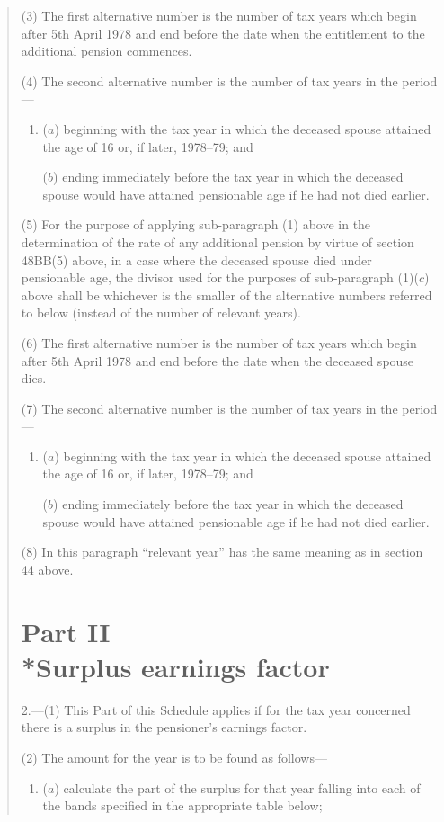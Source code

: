 \documentclass[12pt,a4paper]{article}
\begin{document}
\begin{quotation}
(3) The first alternative number is the number of tax years which begin after 5th April 1978 and end before the date when the entitlement to the additional pension commences.

(4) The second alternative number is the number of tax years in the period—
\begin{enumerate}\item[]
($a$) beginning with the tax year in which the deceased spouse attained the age of 16 or, if later, 1978--79; and

($b$) ending immediately before the tax year in which the deceased spouse would have attained pensionable age if he had not died earlier.
\end{enumerate}

(5) For the purpose of applying sub-paragraph (1)  above in the determination of the rate of any additional pension by virtue of section 48BB(5)  above, in a case where the deceased spouse died under pensionable age, the divisor used for the purposes of sub-paragraph (1)($c$)  above shall be whichever is the smaller of the alternative numbers referred to below (instead of the number of relevant years).

(6) The first alternative number is the number of tax years which begin after 5th April 1978 and end before the date when the deceased spouse dies.

(7) The second alternative number is the number of tax years in the period—
\begin{enumerate}\item[]
($a$) beginning with the tax year in which the deceased spouse attained the age of 16 or, if later, 1978--79; and

($b$) ending immediately before the tax year in which the deceased spouse would have attained pensionable age if he had not died earlier.
\end{enumerate}

(8) In this paragraph “relevant year” has the same meaning as in section 44 above.

\section*{Part II\\*Surplus earnings factor}

2.---(1) This Part of this Schedule applies if for the tax year concerned there is a surplus in the pensioner’s earnings factor.

(2) The amount for the year is to be found as follows—
\begin{enumerate}\item[]
($a$) calculate the part of the surplus for that year falling into each of the bands specified in the appropriate table below;


\end{enumerate}
\end{quotation}
\end{document}
